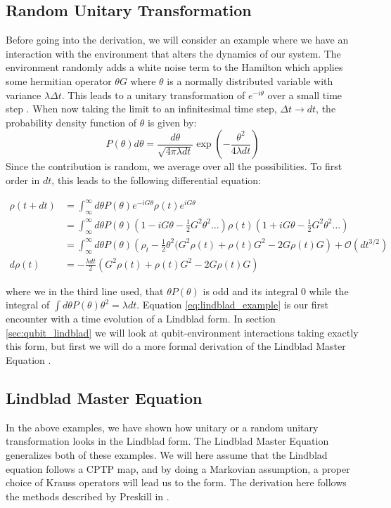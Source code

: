 \subsection{Random Unitary Transformation} \label{sec:random_unitary_transformation}
Before going into the derivation, we will consider an example where we have an interaction with the environment that alters the dynamics of our system. The environment randomly adds a white noise term to the Hamilton which applies some hermitian operator $\theta G$ where $\theta$ is a normally distributed variable with variance $\lambda \Delta t$. This leads to a unitary transformation of $e^{-i\theta}$ over a small time step . When now taking the limit to an infinitesimal time step, $\Delta t \to dt$, the probability density function of $\theta$ is given by:
\begin{equation}
    P(\theta) d\theta = \frac{d\theta}{\sqrt{4\pi\lambda dt}}\exp(-\frac{\theta^2}{4\lambda dt})
\end{equation}
Since the contribution is random, we average over all the possibilities. To first order in $dt$, this leads to the following differential equation:
\begin{fullwidth}
\begin{align}
    \rho(t+dt)  &= \int_\infty^\infty d\theta P(\theta) e^{-iG\theta}\rho(t)e^{iG\theta}  \nonumber \\
                &= \int_\infty^\infty d\theta P(\theta) (1 - iG\theta  - \frac12 G^2\theta^2 \dots)\rho(t) (1 + iG\theta - \frac12 G^2\theta^2 \dots)  \nonumber \\
                &= \int_\infty^\infty d\theta P(\theta) \left(\rho_t - \frac12\theta^2(G^2\rho(t) + \rho(t)G^2 - 2 G\rho(t) G\right) + \mathcal{O}(dt^{3/2}) \nonumber \\
    d\rho(t)    &=  - \frac{\lambda dt}{2} \left(G^2\rho(t) + \rho(t)G^2 - 2 G\rho(t) G\right) \label{eq:lindblad_example}
\end{align}
\end{fullwidth}
where we in the third line used, that $\theta P(\theta)$ is odd and its integral $0$ while the integral of $\int d\theta P(\theta) \theta^2 = \lambda dt$. Equation \ref{eq:lindblad_example} is our first encounter with a time evolution of a Lindblad form. In section \ref{sec:qubit_lindblad} we will look at qubit-environment interactions taking exactly this form, but first we will do a more formal derivation of the Lindblad Master Equation \cite{pearle_simple_2012}.

\subsection{Lindblad Master Equation}
In the above examples, we have shown how unitary or a random unitary transformation looks in the Lindblad form. The Lindblad Master Equation generalizes both of these examples. We will here assume that the Lindblad equation follows a CPTP map, and by doing a Markovian assumption, a proper choice of Krauss operators will lead us to the form. The derivation here follows the methods described by Preskill in \cite{preskill_lecture_chap_3}.

